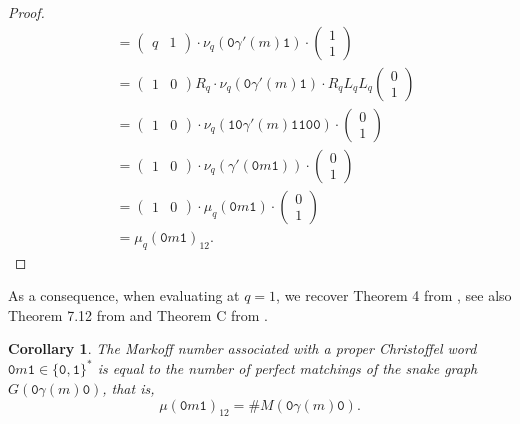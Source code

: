 \documentclass[a4paper,12pt]{amsart}
\newtheorem{corollary}[definition]{Corollary}
\newcommand{\0}{\mathtt{0}}
\newcommand{\1}{\mathtt{1}}
\newcommand{\2}{\mathtt{2}}
\newcommand{\3}{\mathtt{3}}
\begin{document}
\begin{proof}
\begin{align*}
        &=
        \left(\begin{array}{cc} q & 1 \end{array}\right)
            \cdot \nu_q(\0\gamma'(m)\1)\cdot
        \left(\begin{smallmatrix} 1 \\ 1 \end{smallmatrix}\right)\\
        &=
        \left(\begin{array}{cc} 1 & 0 \end{array}\right)
            R_q
            \cdot \nu_q(\0\gamma'(m)\1)\cdot
            R_qL_qL_q
        \left(\begin{smallmatrix} 0 \\ 1 \end{smallmatrix}\right)\\
        &=
        \left(\begin{array}{cc} 1 & 0 \end{array}\right)
            \cdot \nu_q(\1\0\gamma'(m)\1\1\0\0)\cdot
        \left(\begin{smallmatrix} 0 \\ 1 \end{smallmatrix}\right)\\
        &=
        \left(\begin{array}{cc} 1 & 0 \end{array}\right)
            \cdot \nu_q(\gamma'(\0m\1))\cdot
        \left(\begin{smallmatrix} 0 \\ 1 \end{smallmatrix}\right)\\
        &=
        \left(\begin{array}{cc} 1 & 0 \end{array}\right)
            \cdot \mu_q(\0m\1)\cdot
        \left(\begin{smallmatrix} 0 \\ 1 \end{smallmatrix}\right)\\
        &= \mu_q(\0m\1)_{12}.
    \end{align*}
    \endgroup
\end{proof}

As a consequence, when evaluating at $q=1$, we recover
Theorem 4 from \cite{zbMATH07181526},
see also Theorem 7.12 from \cite{MR3098784}
and Theorem C from \cite{MR4058266}.

\begin{corollary}\label{cor:we-recover-the-Markoff-number}
    The Markoff number associated with a proper Christoffel
    word $\0 m\1\in\{\0,\1\}^*$ is
    equal to the number of perfect matchings
    of the snake graph $G(\0\gamma(m)\0)$, that is,
    \[
        \mu(\0m\1)_{12}
        =
        \# M(\0\gamma(m)\0).
    \]
\end{corollary}
\end{document}
